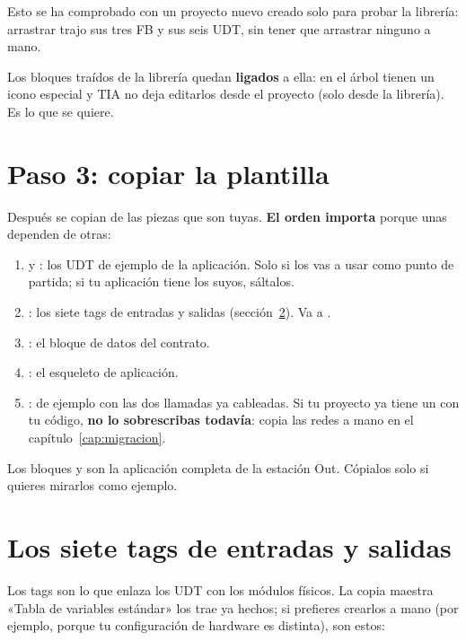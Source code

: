 \begin{consejo}
Esto se ha comprobado con un proyecto nuevo creado solo para probar la librería: arrastrar  trajo sus tres FB y sus seis UDT, sin tener que arrastrar ninguno a mano.
\end{consejo}

Los bloques traídos de la librería quedan \textbf{ligados} a ella: en el árbol tienen un icono especial y TIA no deja editarlos desde el proyecto (solo desde la librería). Es lo que se quiere.

\section{Paso 3: copiar la plantilla}\label{sec:copiar-plantilla}
Después se copian de  las piezas que son tuyas. \textbf{El orden importa} porque unas dependen de otras:

\begin{enumerate}
\item {} y : los UDT de ejemplo de la aplicación. Solo si los vas a usar como punto de partida; si tu aplicación tiene los suyos, sáltalos.
\item {}: los siete tags de entradas y salidas (sección~\ref{sec:tags}). Va a .
\item {}: el bloque de datos del contrato.
\item {}: el esqueleto de aplicación.
\item {}:  de ejemplo con las dos llamadas ya cableadas. Si tu proyecto ya tiene un  con tu código, \textbf{no lo sobrescribas todavía}: copia las redes a mano en el capítulo~\ref{cap:migracion}.
\end{enumerate}
Los bloques  y  son la aplicación completa de la estación Out. Cópialos solo si quieres mirarlos como ejemplo.

\section{Los siete tags de entradas y salidas}\label{sec:tags}
Los tags son lo que enlaza los UDT con los módulos físicos. La copia maestra «Tabla de variables estándar» los trae ya hechos; si prefieres crearlos a mano (por ejemplo, porque tu configuración de hardware es distinta), son estos:

